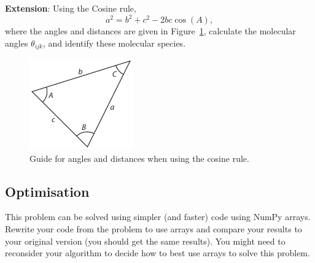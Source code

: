 \documentclass[a4paper]{article}
\begin{document}
\textbf{Extension}: Using the Cosine rule,
%
\begin{equation}
  a^2 = b^2 + c^2 -2bc\cos(A),
\end{equation}
%
where the angles and distances are given in Figure~\ref{fig:cosine}, calculate the molecular angles $\theta_{ijk}$, and identify these molecular species.
%
\begin{figure}[t]
\centering
\includegraphics[width=0.4\textwidth]{triangle}
\caption{\label{fig:cosine} Guide for angles and distances when using the cosine rule.}
\end{figure}
%

\subsection{Optimisation}
This problem can be solved using simpler (and faster) code using NumPy arrays. Rewrite your code from the problem to use arrays and compare your results to your original version (you should get the same results). You might need to reconsider your algorithm to decide how to best use arrays to solve this problem.



\end{document}
